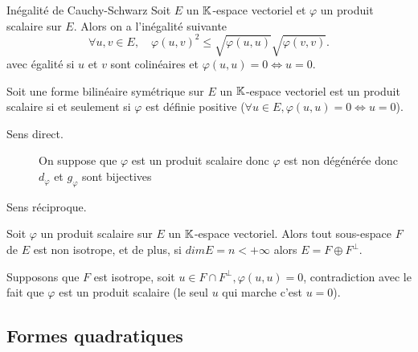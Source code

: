 \documentclass[a4paper,12pt]{article}
\begin{document}
\begin{proposition}{Inégalité de Cauchy-Schwarz}{}
    Soit $E$ un $\mathbb{K}$-espace vectoriel et $\varphi$ un produit scalaire sur $E$.
    Alors on a l'inégalité suivante
    $$
    \forall u, v \in E, \quad \varphi(u, v)^2 \leq \sqrt{\varphi(u, u)} \sqrt{\varphi(v, v)}.
    $$
    avec égalité si $u$ et $v$ sont colinéaires et $\varphi(u, u) = 0 \iff u = 0$.
\end{proposition}

\begin{demonstration}
    
\end{demonstration}

\begin{proposition}{}{}
    Soit une forme bilinéaire symétrique sur $E$ un $\mathbb{K}$-espace vectoriel est un produit scalaire
    si et seulement si $\varphi$ est définie positive ($\forall u \in E, \varphi(u, u) = 0 \iff u = 0$).
\end{proposition}

\begin{demonstration}
    \begin{description}
        \item[Sens direct.] On suppose que $\varphi$ est un produit scalaire donc $\varphi$ est non dégénérée donc $d_\varphi$ et $g_\varphi$ sont bijectives
        
        \item[Sens réciproque.]
    \end{description}
\end{demonstration}

\begin{proposition}{}{}
    Soit $\varphi$ un produit scalaire sur $E$ un $\mathbb{K}$-espace vectoriel.
    Alors tout sous-espace $F$ de $E$ est non isotrope, et de plus, si $dim E = n < +\infty$ alors $E = F \oplus F^\perp$.
\end{proposition}

\begin{demonstration}
    Supposons que $F$ est isotrope, soit $u \in F \cap F^\perp, \varphi(u, u) = 0$, contradiction
    avec le fait que $\varphi$ est un produit scalaire (le seul $u$ qui marche c'est $u = 0$).
    
\end{demonstration}

\subsection{Formes quadratiques}
\end{document}
